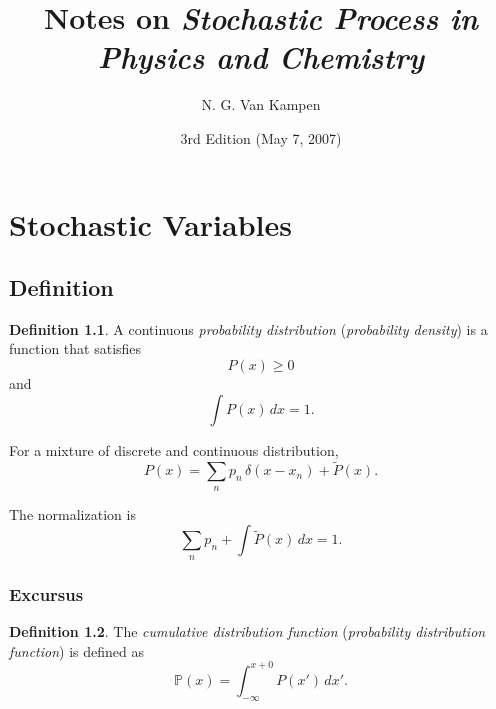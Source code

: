 \documentclass{book}
\numberwithin{equation}{section}
\theoremstyle{plain}
\theoremstyle{definition}
\newtheorem{defn}{Definition}[section]
\theoremstyle{remark}
\begin{document}
\newcommand{\repl}[2]{{\color{gray} [#1] }{\color{blue} #2}}
\newcommand{\add}[1]{{\color{blue} #1}}
\newcommand{\del}[1]{{\color{gray} [#1]}}
\newcommand{\note}[1]{{\color{OliveGreen}\small [\textbf{Comment.} #1]}}

\newcommand{\hl}[1]{{\color{red} #1}}

\title{Notes on \emph{Stochastic Process in Physics and Chemistry}\cite{vankampen}}
\author{N. G. Van Kampen}
\date{3rd Edition (May 7, 2007)}

\maketitle

\tableofcontents


\chapter{Stochastic Variables}

\section{Definition}

\begin{defn}
  A continuous \emph{probability distribution}
  (\emph{probability density}) is a function
  that satisfies
  \begin{equation}
    P(x) \ge 0
    \label{eq:Px_nonneg}
  \end{equation}
  and
  \begin{equation}
    \int P(x) \, dx = 1.
    \label{eq:Px_normalize}
  \end{equation}
\end{defn}

For a mixture of discrete and continuous distribution,
\begin{equation}
  P(x) = \sum_n p_n \, \delta(x - x_n) + \tilde P(x).
  \label{eq:Px_mixture}
\end{equation}

The normalization is
$$
\sum_{n} p_n + \int \tilde P(x) \, dx = 1.
$$

\subsection*{Excursus}

\begin{defn}
  The \emph{cumulative distribution function}
  (\emph{probability distribution function})
  is defined as
  \begin{equation}
    \mathbb{P}(x) = \int_{-\infty}^{x+0} P(x') \, dx'.
  \end{equation}
\end{defn}
\end{document}
